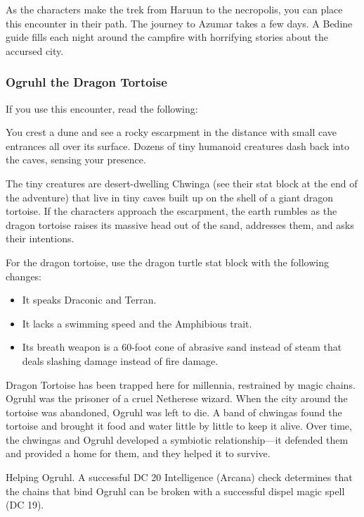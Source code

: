 \documentclass[10pt,a4paper,twoside,bg=print,twocolumn,openany,nodeprecatedcode]{dndbook}
\begin{document}
As the characters make the trek from Haruun to the necropolis, you can place this encounter in their path. The journey to Azumar takes a few days. A Bedine guide fills each night around the campfire with horrifying stories about the accursed city.

\subsubsection{Ogruhl the Dragon Tortoise}
If you use this encounter, read the following:

\begin{DndReadAloud}{}
You crest a dune and see a rocky escarpment in the distance with small cave entrances all over its surface. Dozens of tiny humanoid creatures dash back into the caves, sensing your presence.

\end{DndReadAloud}

The tiny creatures are desert-dwelling Chwinga (see their stat block at the end of the adventure) that live in tiny caves built up on the shell of a giant dragon tortoise. If the characters approach the escarpment, the earth rumbles as the dragon tortoise raises its massive head out of the sand, addresses them, and asks their intentions.

For the dragon tortoise, use the dragon turtle stat block with the following changes:


\begin{itemize}
\item It speaks Draconic and Terran.
\item It lacks a swimming speed and the Amphibious trait.
\item Its breath weapon is a 60-foot cone of abrasive sand instead of steam that deals slashing damage instead of fire damage.
\end{itemize}

Dragon Tortoise has been trapped here for millennia, restrained by magic chains. Ogruhl was the prisoner of a cruel Netherese wizard. When the city around the tortoise was abandoned, Ogruhl was left to die. A band of chwingas found the tortoise and brought it food and water little by little to keep it alive. Over time, the chwingas and Ogruhl developed a symbiotic relationship—it defended them and provided a home for them, and they helped it to survive.

Helping Ogruhl. A successful DC 20 Intelligence (Arcana) check determines that the chains that bind Ogruhl can be broken with a successful dispel magic spell (DC 19).
\end{document}
